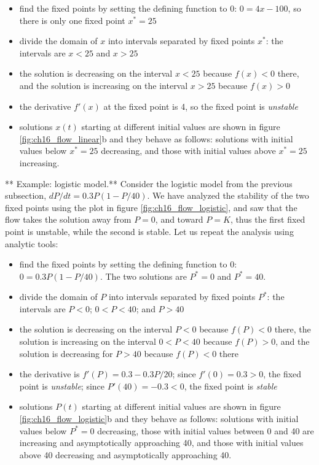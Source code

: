 \documentclass[
  letterpaper,
  DIV=11,
  numbers=noendperiod]{scrreprt}
\begin{document}
\begin{itemize}
\item
  find the fixed points by setting the defining function to 0:
  \(0 = 4x -100\), so there is only one fixed point \(x^* = 25\)
\item
  divide the domain of \(x\) into intervals separated by fixed points
  \(x^*\): the intervals are \(x<25\) and \(x>25\)
\item
  the solution is decreasing on the interval \(x<25\) because \(f(x)<0\)
  there, and the solution is increasing on the interval \(x>25\) because
  \(f(x)>0\)
\item
  the derivative \(f'(x)\) at the fixed point is 4, so the fixed point
  is \emph{unstable}
\item
  solutions \(x(t)\) starting at different initial values are shown in
  figure \ref{fig:ch16_flow_linear}b and they behave as follows:
  solutions with initial values below \(x^*=25\) decreasing, and those
  with initial values above \(x^*=25\) increasing.
\end{itemize}

** Example: logistic model.**
 Consider the logistic
model from the previous subsection, \(dP/dt =0.3P(1-P/40)\). We have
analyzed the stability of the two fixed points using the plot in figure
\ref{fig:ch16_flow_logistic}, and saw that the flow takes the solution
away from \(P=0\), and toward \(P=K\), thus the first fixed point is
unstable, while the second is stable. Let us repeat the analysis using
analytic tools:

\begin{itemize}
\item
  find the fixed points by setting the defining function to 0:
  \(0 = 0.3P(1-P/40)\). The two solutions are \(P^*=0\) and \(P^*=40\).
\item
  divide the domain of \(P\) into intervals separated by fixed points
  \(P^*\): the intervals are \(P<0\); \(0<P<40\); and \(P>40\)
\item
  the solution is decreasing on the interval \(P<0\) because \(f(P)<0\)
  there, the solution is increasing on the interval \(0<P<40\) because
  \(f(P)>0\), and the solution is decreasing for \(P>40\) because
  \(f(P)<0\) there
\item
  the derivative is \(f'(P)=0.3-0.3P/20\); since \(f'(0)=0.3 > 0\), the
  fixed point is \emph{unstable}; since \(P'(40)=-0.3<0\), the fixed
  point is \emph{stable}
\item
  solutions \(P(t)\) starting at different initial values are shown in
  figure \ref{fig:ch16_flow_logistic}b and they behave as follows:
  solutions with initial values below \(P^*=0\) decreasing, those with
  initial values between 0 and 40 are increasing and asymptotically
  approaching 40, and those with initial values above 40 decreasing and
  asymptotically approaching 40.
\end{itemize}
\end{document}
